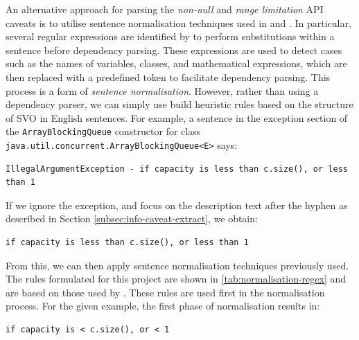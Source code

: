 An alternative approach for parsing the \textit{non-null} and \textit{range limitation} API caveats is to utilise sentence normalisation techniques used in \cite{zhou-directive} and \cite{blasi2018translating}. In particular, several regular expressions are identified by \citeauthor{zhou-directive} to perform substitutions within a sentence before dependency parsing. These expressions are used to detect cases such as the names of variables, classes, and mathematical expressions, which are then replaced with a predefined token to facilitate dependency parsing. This process is a form of \textit{sentence normalisation}. However, rather than using a dependency parser, we can simply use build heuristic rules based on the structure of SVO in English sentences. For example, a sentence in the exception section of the \lstinline{ArrayBlockingQueue} constructor for class \lstinline{java.util.concurrent.ArrayBlockingQueue<E>} says:

\begin{verbatim}
IllegalArgumentException - if capacity is less than c.size(), or less than 1
\end{verbatim}

If we ignore the exception, and focus on the description text after the hyphen as described in Section \ref{subsec:info-caveat-extract}, we obtain:

\begin{verbatim}
if capacity is less than c.size(), or less than 1
\end{verbatim}

From this, we can then apply sentence normalisation techniques previously used. The rules formulated for this project are shown in \ref{tab:normalisation-regex} and are based on those used by \cite{blasi2018translating}. These rules are used first in the normalisation process. For the given example, the first phase of normalisation results in:

\begin{verbatim}
if capacity is < c.size(), or < 1
\end{verbatim}

